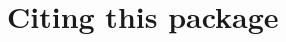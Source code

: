 \documentclass{article}\usepackage[]{graphicx}\usepackage[]{color}
\begin{document}

\section{Citing this package}
\end{document}
